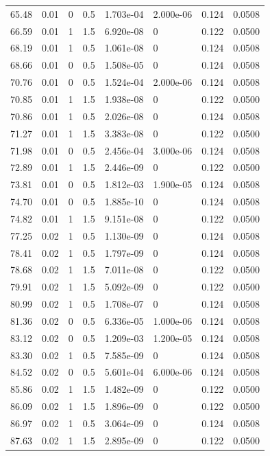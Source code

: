 \documentclass[preview]{standalone}
\begin{document}
{{{\begin{tabular}{L{1.2cm}C{1.2cm} C{0.3cm}C{0.5cm} C{1.4cm}C{1.4cm} C{1.4cm}C{1.4cm}}
  65.48  &  0.01  & 0     & 0.5 &  1.703e-04  & 2.000e-06  & 0.124 &  0.0508   \\ 
  66.59  &  0.01  & 1     & 1.5 &  6.920e-08  & 0  & 0.122 &  0.0500   \\ 
  68.19  &  0.01  & 1     & 0.5 &  1.061e-08  & 0  & 0.124 &  0.0508   \\ 
  68.66  &  0.01  & 0     & 0.5 &  1.508e-05  & 0  & 0.124 &  0.0508   \\ 
  70.76  &  0.01  & 0     & 0.5 &  1.524e-04  & 2.000e-06  & 0.124 &  0.0508   \\ 
  70.85  &  0.01  & 1     & 1.5 &  1.938e-08  & 0  & 0.122 &  0.0500   \\ 
  70.86  &  0.01  & 1     & 0.5 &  2.026e-08  & 0  & 0.124 &  0.0508   \\ 
  71.27  &  0.01  & 1     & 1.5 &  3.383e-08  & 0  & 0.122 &  0.0500   \\ 
  71.98  &  0.01  & 0     & 0.5 &  2.456e-04  & 3.000e-06  & 0.124 &  0.0508   \\ 
  72.89  &  0.01  & 1     & 1.5 &  2.446e-09  & 0  & 0.122 &  0.0500   \\ 
  73.81  &  0.01  & 0     & 0.5 &  1.812e-03  & 1.900e-05  & 0.124 &  0.0508   \\ 
  74.70  &  0.01  & 0     & 0.5 &  1.885e-10  & 0  & 0.124 &  0.0508   \\ 
  74.82  &  0.01  & 1     & 1.5 &  9.151e-08  & 0  & 0.122 &  0.0500   \\ 
  77.25  &  0.02  & 1     & 0.5 &  1.130e-09  & 0  & 0.124 &  0.0508   \\ 
  78.41  &  0.02  & 1     & 0.5 &  1.797e-09  & 0  & 0.124 &  0.0508   \\ 
  78.68  &  0.02  & 1     & 1.5 &  7.011e-08  & 0  & 0.122 &  0.0500   \\ 
  79.91  &  0.02  & 1     & 1.5 &  5.092e-09  & 0  & 0.122 &  0.0500   \\ 
  80.99  &  0.02  & 1     & 0.5 &  1.708e-07  & 0  & 0.124 &  0.0508   \\ 
  81.36  &  0.02  & 0     & 0.5 &  6.336e-05  & 1.000e-06  & 0.124 &  0.0508   \\ 
  83.12  &  0.02  & 0     & 0.5 &  1.209e-03  & 1.200e-05  & 0.124 &  0.0508   \\ 
  83.30  &  0.02  & 1     & 0.5 &  7.585e-09  & 0  & 0.124 &  0.0508   \\ 
  84.52  &  0.02  & 0     & 0.5 &  5.601e-04  & 6.000e-06  & 0.124 &  0.0508   \\ 
  85.86  &  0.02  & 1     & 1.5 &  1.482e-09  & 0  & 0.122 &  0.0500   \\ 
  86.09  &  0.02  & 1     & 1.5 &  1.896e-09  & 0  & 0.122 &  0.0500   \\ 
  86.97  &  0.02  & 1     & 0.5 &  3.064e-09  & 0  & 0.124 &  0.0508   \\ 
  87.63  &  0.02  & 1     & 1.5 &  2.895e-09  & 0  & 0.122 &  0.0500   \\ 
\hline 
\end{tabular} 

}}}
\end{document}
